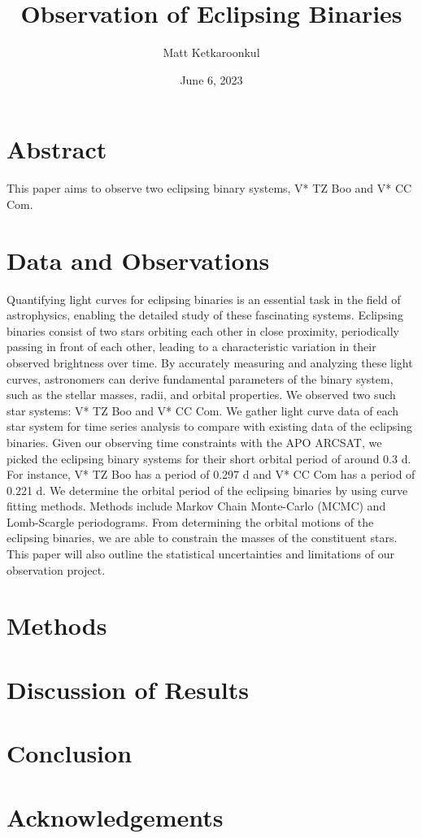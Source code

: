 \documentclass[12pt]{article}
\title{\vspace{-2em} {\bf Observation of Eclipsing Binaries}}
\author{Matt Ketkaroonkul}
\date{June 6, 2023}
\begin{document}
\maketitle

\section{Abstract}

This paper aims to observe two eclipsing binary systems, V* TZ Boo and V* CC Com.
\section{Data and Observations}
Quantifying light curves for eclipsing binaries is an essential task in the field of astrophysics, enabling the detailed study of these fascinating systems. Eclipsing binaries consist of two stars orbiting each other in close proximity, periodically passing in front of each other, leading to a characteristic variation in their observed brightness over time. By accurately measuring and analyzing these light curves, astronomers can derive fundamental parameters of the binary system, such as the stellar masses, radii, and orbital properties.
We observed two such star systems: V* TZ Boo and V* CC Com. We gather light curve data of each star system for time series analysis to compare with existing data of the eclipsing binaries. Given our observing time constraints with the APO ARCSAT, we picked the eclipsing binary systems for their short orbital period of around 0.3 d. For instance, V* TZ Boo has a period of 0.297 d and V* CC Com has a period of 0.221 d.
We determine the orbital period of the eclipsing binaries by using curve fitting methods. Methods include Markov Chain Monte-Carlo (MCMC) and Lomb-Scargle periodograms. From determining the orbital motions of the eclipsing binaries, we are able to constrain the masses of the constituent stars. This paper will also outline the statistical uncertainties and limitations of our observation project. 

\section{Methods}
\section{Discussion of Results}
\section{Conclusion}
\section{Acknowledgements}
\end{document}
